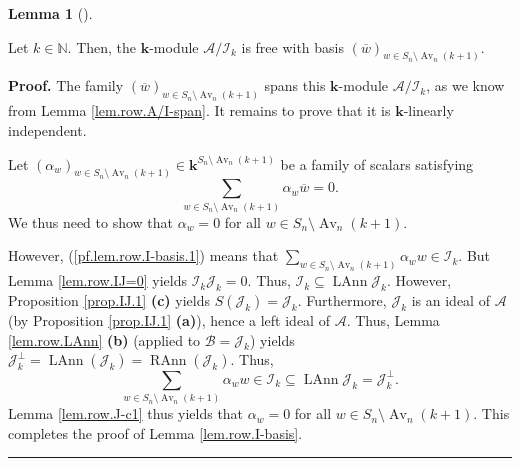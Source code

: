 \documentclass[numbers=enddot,12pt,final,onecolumn,notitlepage]{scrartcl}%
\numberwithin{exer}{subsection}
\theoremstyle{definition}
\newtheorem{lem}[theo]{Lemma}
\newenvironment{lemma}[1][]
{\begin{lem}[#1]\begin{leftbar}}
{\end{leftbar}\end{lem}}
\newenvironment{proof}[1][Proof]{\noindent\textbf{#1.} }{\ \rule{0.5em}{0.5em}}
\let\sumnonlimits\sum
\renewcommand{\sum}{\sumnonlimits\limits}
\begin{document}
\begin{lemma}
\label{lem.row.I-basis}Let $k\in\mathbb{N}$. Then, the $\mathbf{k}$-module
$\mathcal{A}/\mathcal{I}_{k}$ is free with basis $\left(  \overline{w}\right)
_{w\in S_{n}\setminus\operatorname*{Av}\nolimits_{n}\left(  k+1\right)  }$.
\end{lemma}

\begin{proof}
The family $\left(  \overline{w}\right)  _{w\in S_{n}\setminus
\operatorname*{Av}\nolimits_{n}\left(  k+1\right)  }$ spans this $\mathbf{k}%
$-module $\mathcal{A}/\mathcal{I}_{k}$, as we know from Lemma
\ref{lem.row.A/I-span}. It remains to prove that it is $\mathbf{k}$-linearly independent.

Let $\left(  \alpha_{w}\right)  _{w\in S_{n}\setminus\operatorname*{Av}%
\nolimits_{n}\left(  k+1\right)  }\in\mathbf{k}^{S_{n}\setminus
\operatorname*{Av}\nolimits_{n}\left(  k+1\right)  }$ be a family of scalars
satisfying%
\begin{equation}
\sum_{w\in S_{n}\setminus\operatorname*{Av}\nolimits_{n}\left(  k+1\right)
}\alpha_{w}\overline{w}=0. \label{pf.lem.row.I-basis.1}%
\end{equation}
We thus need to show that $\alpha_{w}=0$ for all $w\in S_{n}\setminus
\operatorname*{Av}\nolimits_{n}\left(  k+1\right)  $.

However, (\ref{pf.lem.row.I-basis.1}) means that $\sum_{w\in S_{n}%
\setminus\operatorname*{Av}\nolimits_{n}\left(  k+1\right)  }\alpha_{w}%
w\in\mathcal{I}_{k}$. But Lemma \ref{lem.row.IJ=0} yields $\mathcal{I}%
_{k}\mathcal{J}_{k}=0$. Thus, $\mathcal{I}_{k}\subseteq\operatorname*{LAnn}%
\mathcal{J}_{k}$. However, Proposition \ref{prop.IJ.1} \textbf{(c)} yields
$S\left(  \mathcal{J}_{k}\right)  =\mathcal{J}_{k}$. Furthermore,
$\mathcal{J}_{k}$ is an ideal of $\mathcal{A}$ (by Proposition \ref{prop.IJ.1}
\textbf{(a)}), hence a left ideal of $\mathcal{A}$. Thus, Lemma
\ref{lem.row.LAnn} \textbf{(b)} (applied to $\mathcal{B}=\mathcal{J}_{k}$)
yields $\mathcal{J}_{k}^{\perp}=\operatorname*{LAnn}\left(  \mathcal{J}%
_{k}\right)  =\operatorname*{RAnn}\left(  \mathcal{J}_{k}\right)  $. Thus,
\[
\sum_{w\in S_{n}\setminus\operatorname*{Av}\nolimits_{n}\left(  k+1\right)
}\alpha_{w}w\in\mathcal{I}_{k}\subseteq\operatorname*{LAnn}\mathcal{J}%
_{k}=\mathcal{J}_{k}^{\perp}.
\]
Lemma \ref{lem.row.J-c1} thus yields that $\alpha_{w}=0$ for all $w\in
S_{n}\setminus\operatorname*{Av}\nolimits_{n}\left(  k+1\right)  $. This
completes the proof of Lemma \ref{lem.row.I-basis}.
\end{proof}
\end{document}
